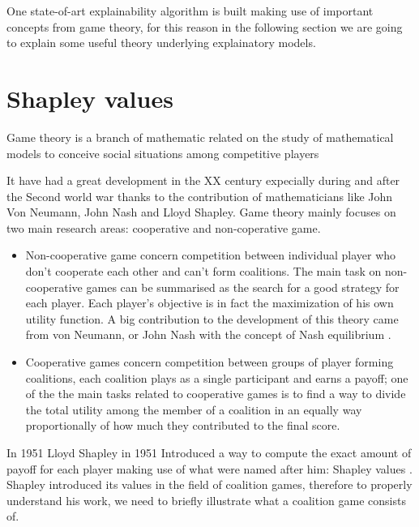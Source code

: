 \documentclass[11pt]{report}
\begin{document}
One state-of-art explainability algorithm is built making use of important concepts from game theory, for this reason in the following section we are going to explain some useful theory underlying explainatory models.


\section{Shapley values}
Game theory is a branch of mathematic related on the study of mathematical models to  conceive social situations among competitive players \cite{ross-2021}

It have had a great development in the XX century expecially during and after the Second world war thanks to the contribution of mathematicians like John Von Neumann, John Nash and Lloyd Shapley.
Game theory mainly focuses on two main research areas: cooperative and non-coperative game.
\begin{itemize}
\item Non-cooperative game concern competition between individual player who don't cooperate each other and can't form coalitions. The main task on non-cooperative games can be summarised as the search for a good strategy for each player. Each player's objective is in fact the maximization of his own utility function.
A big contribution to the development of this theory came from von Neumann, or John Nash with the concept of Nash equilibrium \cite{nash-1950}.

\item Cooperative games concern competition between groups of player forming coalitions, each coalition plays as a single participant and earns a payoff; one of the the main tasks related to cooperative games is to find a way to divide the total utility among the member of a coalition in an equally way proportionally of how much they contributed to the final score.
\end{itemize}
In 1951 Lloyd Shapley in 1951 Introduced a way to compute the exact amount of payoff for each player making use of what were named after him: Shapley values \cite{shap-1951}\cite{shap-1953}.
Shapley introduced its values in the field of coalition games, therefore to properly understand his work, we need to briefly illustrate what a coalition game consists of.
\end{document}
